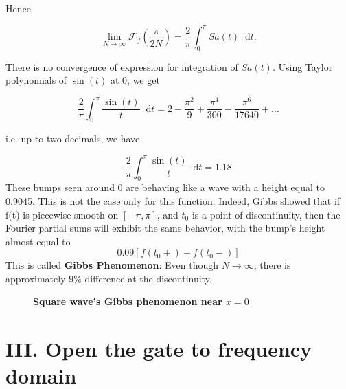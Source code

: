 \documentclass[margin,line]{res}
\newcommand*{\dif}{\mathop{}\!\mathrm{d}}
\begin{document}
\begin{resume}
Hence

$$
\lim_{N \rightarrow \infty} \mathscr{F}_f \left(\frac{\pi}{2N}\right) = \frac{2}{\pi}\int_{0}^{\pi}Sa(t) \dif t.
$$

There is no convergence of expression for integration of $Sa(t)$. Using Taylor polynomials of $\sin(t)$ at 0, we get

$$
\frac{2}{\pi}\int_{0}^{\pi}\frac{\sin(t)}{t} \dif t = 2 - \frac{\pi^2}{9} + \frac{\pi^4}{300} - \frac{\pi^6}{17640}+\ldots
$$

i.e. up to two decimals, we have

$$
\frac{2}{\pi}\int_{0}^{\pi}\frac{\sin(t)}{t} \dif t = 1.18
$$
These bumps seen around 0 are behaving like a wave with a height equal to 0.9045. This is not the case only for this function. Indeed, Gibbs showed that if f(t) is piecewise smooth on $[-\pi,\pi]$, and $t_0$ is a point of discontinuity, then the Fourier partial sums will exhibit the same behavior, with the bump's height almost equal to 
$$
0.09\left[ f(t_0+) + f(t_0-)\right]
$$
This is called \textbf{Gibbs Phenomenon}: Even though $N \rightarrow \infty$, there is approximately $9\%$ difference at the discontinuity.
\begin{figure}[H]
	\centerline{\textbf{Square wave's Gibbs phenomenon near $x=0$}}
	\centerline{}
\end{figure}
\clearpage

\section{\sc III. Open the gate to frequency domain}
\hspace{.05in}

\end{resume}
\end{document}
